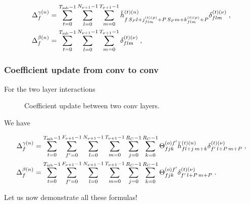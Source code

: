 \begin{align}
\Delta_f^{\gamma(n)}&=
%
\sum_{t=0}^{T_{{\rm mb}}-1}\sum_{l=0}^{N_{\nu+1}-1}\sum_{m=0}^{T_{\nu+1}-1}
%
\tilde{h}_{f\,S_P l+j_{flm}^{(t)(p)}+P\,S_Pm+k_{flm}^{(t)(p)}+P}^{(t)(n)}\delta^{(t)(\nu)}_{flm}\;,\notag\\
%
\Delta_f^{\beta(n)}&=
%
\sum_{t=0}^{T_{{\rm mb}}-1}\sum_{l=0}^{N_{\nu+1}-1}\sum_{m=0}^{T_{\nu+1}-1}\delta^{(t)(\nu)}_{flm}\;,
\end{align}


\subsubsection{Coefficient update from conv to conv}

For the two layer interactions

\begin{figure}[H]
\begin{center}
\caption{Coefficient update between two conv layers.}
\end{center}
\end{figure}

We have


\begin{align}
\Delta_f^{\gamma(n)}&=
%
\sum_{t=0}^{T_{{\rm mb}}-1}\sum_{f'=0}^{F_{\nu+1}-1}\sum_{l=0}^{N_{\nu+1}-1}\sum_{m=0}^{T_{\nu+1}-1}
%
\sum_{j=0}^{R_C-1}\sum_{k=0}^{R_C-1}\Theta^{(o)f'}_{fjk}
%
\tilde{h}^{(t)(n)}_{fl+j\,m+k}\delta^{(t)(\nu)}_{f'\,l+P\,m+P}\;,\notag\\
%
\Delta_f^{\beta(n)}&=
%
\sum_{t=0}^{T_{{\rm mb}}-1}\sum_{f'=0}^{F_{\nu+1}-1}\sum_{l=0}^{N_{\nu+1}-1}\sum_{m=0}^{T_{\nu+1}-1}
%
\sum_{j=0}^{R_C-1}\sum_{k=0}^{R_C-1}\Theta^{(o)f'}_{fjk}\delta^{(t)(\nu)}_{f'\,l+P\,m+P}\;.
\end{align}

Let us now demonstrate all these formulas!

